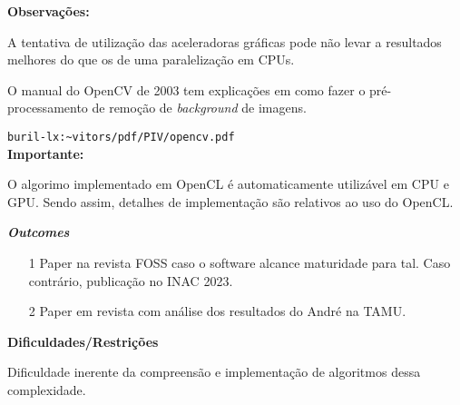\textbf{Observações:}

A tentativa de utilização das aceleradoras gráficas pode não levar a resultados 
melhores do que os de uma paralelização em CPUs.



O manual do OpenCV de 2003 tem explicações em como fazer o pré-processamento 
de remoção de \textit{background} de imagens.

\texttt{buril-lx:\textasciitilde vitors/pdf/PIV/opencv.pdf}\\

\textbf{Importante:}


O algorimo implementado em OpenCL é automaticamente utilizável em CPU e GPU. Sendo assim, detalhes de implementação
são relativos ao uso do OpenCL.

\textbf{\textit{Outcomes}}

\begin{itemize}
	\item[1] Paper na revista FOSS caso o software alcance maturidade para tal. Caso contrário, publicação no INAC 2023.
	\item[2] Paper em revista com análise dos resultados do André na TAMU.

\end{itemize}


\textbf{Dificuldades/Restrições}

Dificuldade inerente da compreensão e implementação de algoritmos dessa complexidade.\\

